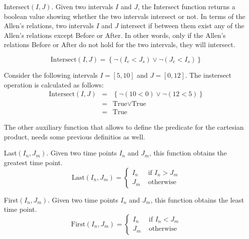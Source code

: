 \documentclass{llncs}
\begin{document}
\begin{definition}
 \label{def:crisp-intersect}
Intersect$\left(I, J \right)$. Given two intervals $I$ and $J$, the Intersect function returns a boolean value showing whether the two intervals intersect or not. In terms of the Allen's relations, two intervals $I$ and $J$ intersect if between them exist any of the Allen's relations except Before or After. In other words, only if the Allen's relations Before or After do not hold for the two intervals, they will intersect.

\begin{equation}
 \label{eq:crisp-intersect}
\mbox{Intersect}\left( I, J \right) = \left \lbrace \neg \left(I_e < J_s \right) \vee \neg \left(J_e < I_s \right) \right \rbrace
\end{equation}


\end{definition}


\begin{example}
Consider the following intervals $I = \left[5, 10 \right]$ and  $J = \left[0, 12 \right]$. The instersect operation is calculated as follows:
\begin{align}
\mbox{Intersect}\left( I, J \right) &=& \left \lbrace \neg \left(10 < 0 \right)  \vee \neg \left(12 < 5 \right) \right \rbrace \\
\nonumber
&=& \mbox{True} \vee \mbox{True} \\
\nonumber &=& \mbox{True}
\end{align}

\end{example}

The other auxiliary function that allows to define the predicate for the cartesian product, needs some previous definitios as well. 

\begin{definition}
 \label{def:crisp-last}
Last$\left(I_n, J_m \right)$. Given two time points $I_n$ and $J_m$, this function obtains the greatest time point.
\begin{equation}
 \label{eq:last-crisp}
\mbox{Last}\left(I_n, J_m \right) = 
\begin{cases}
I_n & \mbox{ if } I_n > J_m \\
J_m & \mbox{ otherwise } 
\end{cases}
\end{equation}
\end{definition}

\begin{definition}
 \label{def:crisp-first}
First$\left(I_n, J_m \right)$. Given two time points $I_n$ and $J_m$, this function obtains the least time point.
\begin{equation}
 \label{eq:first-crisp}
\mbox{First}\left(I_n, J_m \right) =
\begin{cases}
I_n & \mbox{ if } I_n < J_m \\
J_m & \mbox{ otherwise } 
\end{cases}
\end{equation}
\end{definition}
\end{document}
